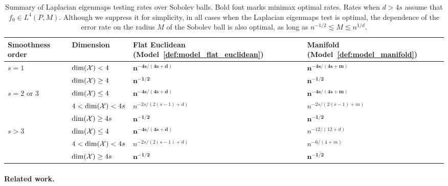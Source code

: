 \begin{table}
	\begin{center}
		\begin{tabular}{p{} p{} | p{} p{} }
			Smoothness order & Dimension & Flat Euclidean (Model~\ref{def:model_flat_euclidean}) & Manifold (Model~\ref{def:model_manifold}) \\
			\hline
			\multirow{2}{*}{$s = 1$} & $\dim(\mathcal{X}) < 4$ & $\bm{n^{-4s/(4s + d)}}$ & $\bm{n^{-4s/(4s + m)}}$ \\
			& $\dim(\mathcal{X}) \geq 4$ & $\bm{n^{-1/2}}$ & $\bm{n^{-1/2}}$ \\
			\hline
			\multirow{3}{*}{$s = 2$ or $3$} & $\dim(\mathcal{X}) \leq 4$  & $\bm{n^{-4s/(4s + d)}}$ & $\bm{n^{-4s/(4s + m)}}$ \\
			& $4 <\dim(\mathcal{X}) < 4s$  & $n^{-2s/(2(s - 1) + d)}$ & $n^{-2s/(2(s - 1) + m)}$\\
			& $\dim(\mathcal{X}) \geq 4s$ & $\bm{n^{-1/2}}$ & $\bm{n^{-1/2}}$ \\
			\hline
			\multirow{3}{*}{$s > 3$} & $\dim(\mathcal{X}) \leq 4$ & $\bm{n^{-4s/(4s + d)}}$ & $n^{-12/(12 + d)}$ \\
			& $4 < \dim(\mathcal{X}) < 4s$ & $n^{-2s/(2(s - 1) + d)}$ & $n^{-6/(4 + m)}$ \\
			& $\dim(\mathcal{X}) \geq 4s$ & $\bm{n^{-1/2}}$ & $\bm{n^{-1/2}}$ \\
		\end{tabular}
	\end{center}
	\caption{Summary of Laplacian eigenmaps testing rates over Sobolev balls. Bold font marks minimax optimal rates. Rates when $d > 4s$ assume that $f_0 \in L^4(P,M)$. Although we suppress it for simplicity, in all cases when the Laplacian eigenmaps test is optimal, the dependence of the error rate on the radius $M$ of the Sobolev ball is also optimal, as long as $n^{-1/2} \lesssim M \lesssim n^{1/d}$.}
	\label{tbl:testing_rates}
\end{table}

\paragraph{Related work.}

